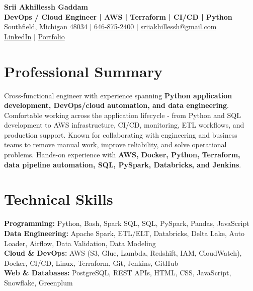 \documentclass[letterpaper,10pt]{article}
\begin{document}
\fontsize{9.35pt}{10.45pt}\selectfont

\begin{center}
    {\LARGE \textbf{Srii Akhillessh Gaddam}} \\[-1pt]
    \textbf{DevOps / Cloud Engineer | AWS | Terraform | CI/CD | Python} \\[2pt]
    Southfield, Michigan 48034 $|$
    \href{tel:6468752400}{646-875-2400} $|$
    \href{mailto:sriiakhillessh@gmail.com}{sriiakhillessh@gmail.com} \\[1pt]
    \href{https://www.linkedin.com/in/srii-akhiilessh-gaddam-b48668191/}{LinkedIn} $|$
    \href{https://sriiakhillesshg.github.io/portfolio/}{Portfolio}
\end{center}
\vspace{-8pt}

\section{Professional Summary}
\small{Cross-functional engineer with experience spanning \textbf{Python application development, DevOps/cloud automation, and data engineering}. Comfortable working across the application lifecycle - from Python and SQL development to AWS infrastructure, CI/CD, monitoring, ETL workflows, and production support. Known for collaborating with engineering and business teams to remove manual work, improve reliability, and solve operational problems. Hands-on experience with \textbf{AWS, Docker, Python, Terraform, data pipeline automation, SQL, PySpark, Databricks, and Jenkins}.}

\section{Technical Skills}
\small{
\textbf{Programming:} Python, Bash, Spark SQL, SQL, PySpark, Pandas, JavaScript \\
\textbf{Data Engineering:} Apache Spark, ETL/ELT, Databricks, Delta Lake, Auto Loader, Airflow, Data Validation, Data Modeling \\
\textbf{Cloud \& DevOps:} AWS (S3, Glue, Lambda, Redshift, IAM, CloudWatch), Docker, CI/CD, Linux, Terraform, Git, Jenkins, GitHub \\
\textbf{Web \& Databases:} PostgreSQL, REST APIs, HTML, CSS, JavaScript, Snowflake, Greenplum
}
\end{document}
